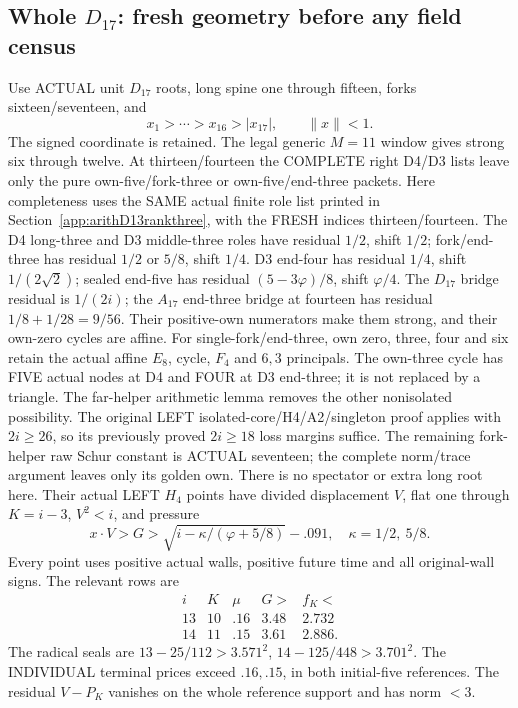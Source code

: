 \subsection{Whole \(D_{17}\): fresh geometry before any field census}
\label{app:arithD17geometry}

Use ACTUAL unit \(D_{17}\) roots, long spine one
through fifteen, forks sixteen/seventeen, and
\[
 x_1>\cdots>x_{16}>|x_{17}|,\qquad\|x\|<1 .
\]
The signed coordinate is retained.
The legal generic \(M=11\) window gives strong
six through twelve.
At thirteen/fourteen the COMPLETE right D4/D3
lists leave only the pure own-five/fork-three
or own-five/end-three packets.
Here completeness uses the SAME actual finite
role list printed in Section~\ref{app:arithD13rankthree},
with the FRESH indices thirteen/fourteen.
The D4 long-three and D3 middle-three roles have
residual \(1/2\), shift \(1/2\);
fork/end-three has residual \(1/2\) or \(5/8\),
shift \(1/4\).
D3 end-four has residual \(1/4\), shift
\(1/(2\sqrt2)\); sealed end-five has residual
\((5-3\varphi)/8\), shift \(\varphi/4\).
The \(D_{17}\) bridge residual is \(1/(2i)\);
the \(A_{17}\) end-three bridge at fourteen
has residual \(1/8+1/28=9/56\).
Their positive-own numerators make them strong,
and their own-zero cycles are affine.
For single-fork/end-three, own zero, three,
four and six retain the actual affine \(E_8\),
cycle, \(F_4\) and \(6,3\) principals.
The own-three cycle has FIVE actual nodes at
D4 and FOUR at D3 end-three; it is not
replaced by a triangle.
The far-helper arithmetic lemma removes the
other nonisolated possibility.
The original LEFT isolated-core/H4/A2/singleton
proof applies with \(2i\ge26\), so its previously
proved \(2i\ge18\) loss margins suffice.
The remaining fork-helper raw Schur constant
is ACTUAL seventeen; the complete norm/trace
argument leaves only its golden own.
There is no spectator or extra long root here.
Their actual LEFT \(H_4\) points have divided
displacement \(V\), flat one through \(K=i-3\),
\(V^2<i\), and pressure
\[
 x\cdot V>G>\sqrt{i-\kappa/(\varphi+5/8)}-.091,\quad
 \kappa=1/2,\ 5/8 .
\]
Every point uses positive actual walls, positive
future time and all original-wall signs.
The relevant rows are
\[
\begin{array}{c|c|c|c|c}
 i&K&\mu&G>&f_K<\\ \hline
13&10&.16&3.48&2.732\\
14&11&.15&3.61&2.886 .
\end{array}
\]
The radical seals are
\(13-25/112>3.571^2\),
\(14-125/448>3.701^2\).
The INDIVIDUAL terminal prices exceed
\(.16,.15\), in both initial-five references.
The residual \(V-P_K\) vanishes on the whole
reference support and has norm \(<3\).

